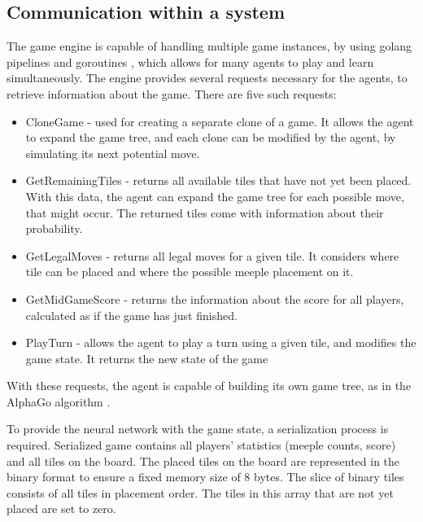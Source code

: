 \subsection{Communication within a system}

The game engine is capable of handling multiple game instances, by using golang pipelines and goroutines \cite{GolangPipeline}, which allows for many agents to play and learn simultaneously. The engine provides several requests necessary for the agents, to retrieve information about the game. There are five such requests:
\begin{itemize}
    \item CloneGame - used for creating a separate clone of a game. It allows the agent to expand the game tree, and each clone can be modified by the agent, by simulating its next potential move.
    \item GetRemainingTiles -  returns all available tiles that have not yet been placed. With this data, the agent can expand the game tree for each possible move, that might occur. The returned tiles come with information about their probability.
    \item GetLegalMoves - returns all legal moves for a given tile. It considers where tile can be placed and where the possible meeple placement on it.
    \item GetMidGameScore - returns the information about the score for all players, calculated as if the game has just finished.
    \item PlayTurn - allows the agent to play a turn using a given tile, and modifies the game state. It returns the new state of the game 
\end{itemize}

With these requests, the agent is capable of building its own game tree, as in the AlphaGo algorithm \cite{AlphaGoAlgorithm}.

To provide the neural network with the game state, a serialization process is required. Serialized game contains all players' statistics (meeple counts, score)  and all tiles on the board. The placed tiles on the board are represented in the binary format to ensure a fixed memory size of 8 bytes. The slice of binary tiles consists of all tiles in placement order. The tiles in this array that are not yet placed are set to zero.
